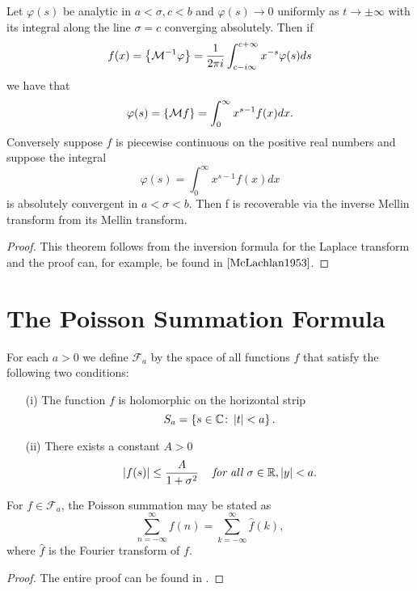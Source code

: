 \begin{theorem}
	Let $\varphi(s)$ be analytic in $a < \sigma, c < b$ and $\varphi(s) \to 0$ uniformly as $t \to \pm\infty$ with its integral along the line $\sigma = c$ converging absolutely. Then if
\begin{equation*}
	f(x) = \left\{\mathcal{M}^{-1} \varphi\right\} = \frac{1}{2 \pi i} \int _{c - i \infty} ^{c + \infty} x^{-s} \varphi(s) ds
\end{equation*}
	we have that
\begin{equation*}
	\varphi(s) = \left\{\mathcal{M} f\right\} = \int _0 ^\infty x^{s - 1} f(x) dx.
\end{equation*}
	Conversely suppose $f$ is piecewise continuous on the positive real numbers and suppose the integral
\begin{equation*}
	\varphi(s) = \int _0 ^\infty x^{s - 1} f(x) dx
\end{equation*}
	is absolutely convergent in $a < \sigma < b$. Then f is recoverable via the inverse Mellin transform from its Mellin transform.
\end{theorem}
\begin{proof}
	This theorem follows from the inversion formula for the Laplace transform and the proof can, for example, be found in $\cite{McLachlan1953}$.
\end{proof}


\section{The Poisson Summation Formula}


\begin{definition}
	For each $a > 0$ we define $\mathcal{F}_a$ by the space of all functions $f$ that satisfy the following two conditions:
\begin{enumerate}
	\item[(i)] The function $f$ is holomorphic on the horizontal strip
		\begin{equation*}
			S_a = \left\{s \in \mathbb{C} \colon \left|t\right| < a\right\}.
		\end{equation*}
	\item[(ii)] There exists a constant $A > 0$
		\begin{equation*}
			\left|f(s)\right| \leq \frac{A}{1 + \sigma^2} \hspace{0.3cm} \textit{ for all } \sigma \in \mathbb{R}, \left|y\right| < a.
		\end{equation*}
\end{enumerate}
\end{definition}


\begin{theorem}
	For $f \in \mathcal{F}_a$, the Poisson summation may be stated as
\begin{equation*}
	\sum _{n = -\infty} ^\infty f(n) = \sum _{k = -\infty} ^\infty \hat{f}(k),
\end{equation*}
	where $\hat{f}$ is the Fourier transform of $f$.
\end{theorem}
\begin{proof}
	The entire proof can be found in \cite{Stein2003}.
\end{proof}